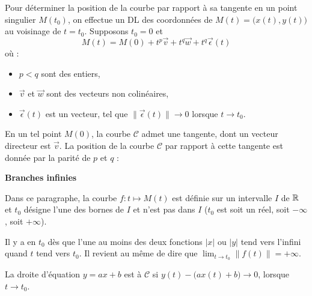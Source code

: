\documentclass[10pt,class=article,crop=false]{standalone}
\begin{document}
\begin{multicols}{2}


Pour déterminer la position de la courbe par rapport à sa tangente
en un point singulier $M(t_0)$,
on effectue un DL des coordonnées de $M(t) = \big(x(t),y(t)\big)$
au voisinage de $t=t_0$.
Supposons $t_0=0$ et 
$$M(t) = M(0) + t^p \vec{v} + t^q \vec{w} +t^q \vec{\epsilon}(t)$$
où :
\begin{itemize}
	\item $p<q$ sont des entiers,
	\item $\vec{v}$ et $\vec{w}$ sont des vecteurs non colinéaires,
	\item $\vec{\epsilon}(t)$ est un vecteur, tel que $\|\vec{\epsilon}(t)\| \to 0$
	lorsque $t\to t_0$.
\end{itemize}

En un tel point $M(0)$, la courbe $\mathcal{C}$ admet une tangente, dont un vecteur directeur est
$\vec{v}$. La position de la courbe $\mathcal{C}$ par rapport à cette tangente
est donnée par la parité de $p$ et $q$ :




\textbf{Branches infinies}

Dans ce paragraphe, la courbe $f : t\mapsto M(t)$ est définie sur un intervalle
$I$ de $\mathbb{R}$ et $t_0$ désigne l'une des bornes de $I$ et n'est pas dans $I$
($t_0$ est soit un réel, soit $-\infty$, soit $+\infty$).


Il y a  en $t_0$ dès que l'une au moins des deux fonctions $|x|$ ou $|y|$ tend vers l'infini quand $t$ tend vers $t_0$.
Il revient au même de dire que $\lim_{t \to t_0}\|f(t)\|=+\infty$.

La droite d'équation $y = ax+b$ est  à $\mathcal{C}$
si $y(t) - \big( a x(t) + b \big) \to 0$, lorsque $t \to t_0$.


\end{multicols}
\end{document}
